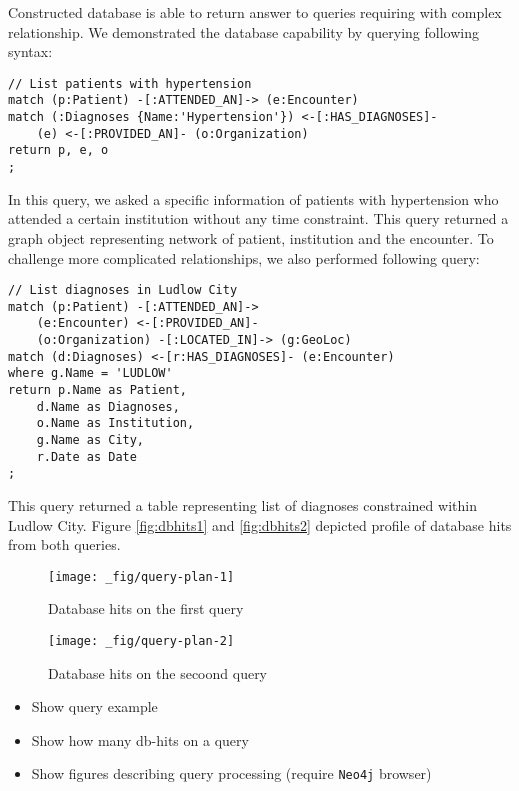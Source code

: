 \documentclass[]{article}
\providecommand{\tightlist}{%
  \setlength{\itemsep}{0pt}\setlength{\parskip}{0pt}}
\begin{document}
Constructed database is able to return answer to queries requiring with
complex relationship. We demonstrated the database capability by
querying following syntax:

\begin{verbatim}
// List patients with hypertension
match (p:Patient) -[:ATTENDED_AN]-> (e:Encounter)
match (:Diagnoses {Name:'Hypertension'}) <-[:HAS_DIAGNOSES]-
    (e) <-[:PROVIDED_AN]- (o:Organization)
return p, e, o
;
\end{verbatim}

In this query, we asked a specific information of patients with
hypertension who attended a certain institution without any time
constraint. This query returned a graph object representing network of
patient, institution and the encounter. To challenge more complicated
relationships, we also performed following query:

\begin{verbatim}
// List diagnoses in Ludlow City
match (p:Patient) -[:ATTENDED_AN]->
    (e:Encounter) <-[:PROVIDED_AN]- 
    (o:Organization) -[:LOCATED_IN]-> (g:GeoLoc)
match (d:Diagnoses) <-[r:HAS_DIAGNOSES]- (e:Encounter)
where g.Name = 'LUDLOW'
return p.Name as Patient,
    d.Name as Diagnoses,
    o.Name as Institution,
    g.Name as City,
    r.Date as Date 
;
\end{verbatim}

This query returned a table representing list of diagnoses constrained
within Ludlow City. Figure \ref{fig:dbhits1} and \ref{fig:dbhits2}
depicted profile of database hits from both queries.

\begin{figure}

{\centering \texttt{[image: \_fig/query-plan-1]} 

}

\caption{\label{fig:dbhits1} Database hits on the first query}\label{fig:fig:dbhits1}
\end{figure}

\begin{figure}

{\centering \texttt{[image: \_fig/query-plan-2]} 

}

\caption{\label{fig:dbhits2} Database hits on the secoond query}\label{fig:fig:dbhits2}
\end{figure}

\begin{itemize}
\tightlist
\item
  Show query example
\item
  Show how many db-hits on a query
\item
  Show figures describing query processing (require \texttt{Neo4j}
  browser)
\end{itemize}
\end{document}
